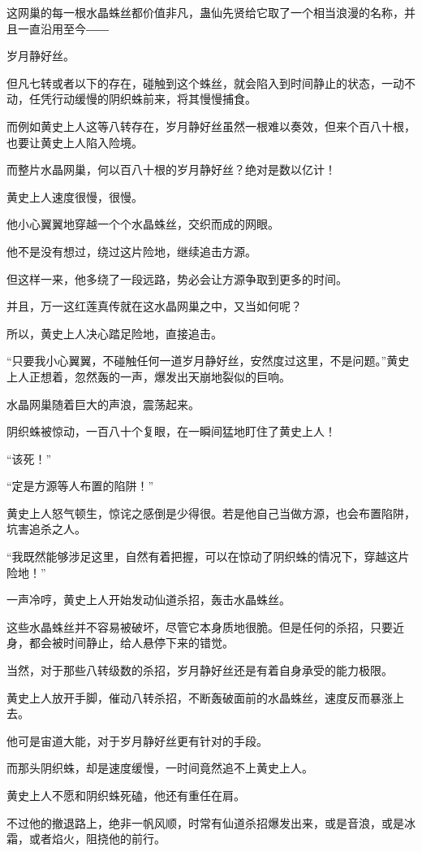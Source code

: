 \begin{this_body}
这网巢的每一根水晶蛛丝都价值非凡，蛊仙先贤给它取了一个相当浪漫的名称，并且一直沿用至今――

岁月静好丝。

但凡七转或者以下的存在，碰触到这个蛛丝，就会陷入到时间静止的状态，一动不动，任凭行动缓慢的阴织蛛前来，将其慢慢捕食。

而例如黄史上人这等八转存在，岁月静好丝虽然一根难以奏效，但来个百八十根，也要让黄史上人陷入险境。

而整片水晶网巢，何以百八十根的岁月静好丝？绝对是数以亿计！

黄史上人速度很慢，很慢。

他小心翼翼地穿越一个个水晶蛛丝，交织而成的网眼。

他不是没有想过，绕过这片险地，继续追击方源。

但这样一来，他多绕了一段远路，势必会让方源争取到更多的时间。

并且，万一这红莲真传就在这水晶网巢之中，又当如何呢？

所以，黄史上人决心踏足险地，直接追击。

“只要我小心翼翼，不碰触任何一道岁月静好丝，安然度过这里，不是问题。”黄史上人正想着，忽然轰的一声，爆发出天崩地裂似的巨响。

水晶网巢随着巨大的声浪，震荡起来。

阴织蛛被惊动，一百八十个复眼，在一瞬间猛地盯住了黄史上人！

“该死！”

“定是方源等人布置的陷阱！”

黄史上人怒气顿生，惊诧之感倒是少得很。若是他自己当做方源，也会布置陷阱，坑害追杀之人。

“我既然能够涉足这里，自然有着把握，可以在惊动了阴织蛛的情况下，穿越这片险地！”

一声冷哼，黄史上人开始发动仙道杀招，轰击水晶蛛丝。

这些水晶蛛丝并不容易被破坏，尽管它本身质地很脆。但是任何的杀招，只要近身，都会被时间静止，给人悬停下来的错觉。

当然，对于那些八转级数的杀招，岁月静好丝还是有着自身承受的能力极限。

黄史上人放开手脚，催动八转杀招，不断轰破面前的水晶蛛丝，速度反而暴涨上去。

他可是宙道大能，对于岁月静好丝更有针对的手段。

而那头阴织蛛，却是速度缓慢，一时间竟然追不上黄史上人。

黄史上人不愿和阴织蛛死磕，他还有重任在肩。

不过他的撤退路上，绝非一帆风顺，时常有仙道杀招爆发出来，或是音浪，或是冰霜，或者焰火，阻挠他的前行。


\end{this_body}
